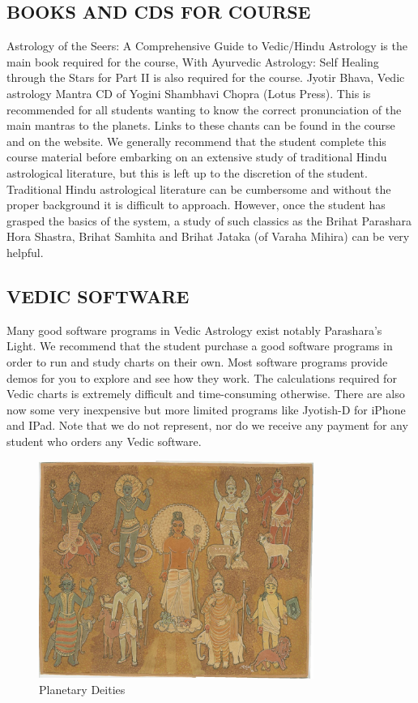 \subsection{BOOKS AND CDS FOR COURSE}
 

Astrology of the Seers: A Comprehensive Guide to Vedic/Hindu Astrology is the main book required for the course,
With Ayurvedic Astrology: Self Healing through the Stars for Part II is also required for the course.
Jyotir Bhava, Vedic astrology Mantra CD of Yogini Shambhavi Chopra (Lotus Press). This is recommended for all students wanting to know the correct pronunciation of the main mantras to the planets. Links to these chants can be found in the course and on the website.
      We generally recommend that the student complete this course material before embarking on an extensive study of traditional Hindu astrological literature, but this is left up to the discretion of the student. Traditional Hindu astrological literature can be cumbersome and without the proper background it is difficult to approach.  However, once the student has grasped the basics of the system, a study of such classics as the Brihat Parashara Hora Shastra, Brihat Samhita and Brihat Jataka (of Varaha Mihira) can be very helpful.  

\subsection{VEDIC SOFTWARE}   Many good software programs in Vedic Astrology exist notably Parashara’s Light. We recommend that the student purchase a good software programs in order to run and study charts on their own. Most software programs provide demos for you to explore and see how they work. The calculations required for Vedic charts is extremely difficult and time-consuming otherwise. There are also now some very inexpensive but more limited programs like Jyotish-D for iPhone and IPad. Note that we do not represent, nor do we receive any payment for any student who orders any Vedic software.


\begin{figure}[H]
 \centering
\includegraphics[width=0.8\textwidth]{pics/intro2.png}\caption{Planetary Deities}
 \end{figure}


